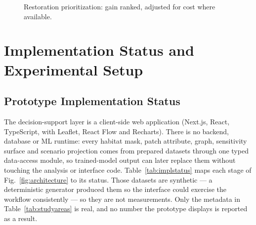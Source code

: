 \documentclass[conference]{IEEEtran}
\begin{document}
\begin{figure}[!tbp]
\centering
{}
\caption{Restoration prioritization: gain ranked, adjusted for cost where available.}
\label{fig:restoration}
\end{figure}


\section{Implementation Status and Experimental Setup}

\subsection{Prototype Implementation Status}

The decision-support layer is a client-side web application (Next.js, React, TypeScript, with Leaflet, React Flow and Recharts). There is no backend, database or ML runtime: every habitat mask, patch attribute, graph, sensitivity surface and scenario projection comes from prepared datasets through one typed data-access module, so trained-model output can later replace them without touching the analysis or interface code. Table~\ref{tab:implstatus} maps each stage of Fig.~\ref{fig:architecture} to its status. Those datasets are synthetic --- a deterministic generator produced them so the interface could exercise the workflow consistently --- so they are not measurements. Only the metadata in Table~\ref{tab:studyareas} is real, and no number the prototype displays is reported as a result.
\end{document}
